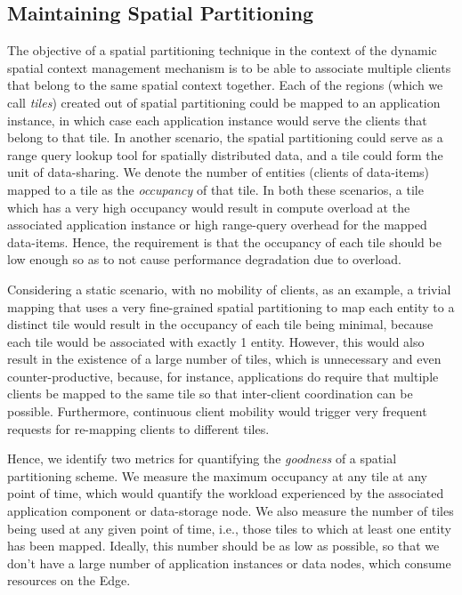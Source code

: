 \subsection{Maintaining Spatial Partitioning}
The objective of a spatial partitioning technique in the context of the dynamic spatial context management mechanism is to be able to associate multiple clients that belong to the same spatial context together. Each of the regions (which we call \textit{tiles}) created out of spatial partitioning could be mapped to an application instance, in which case each application instance would serve the clients that belong to that tile. In another scenario, the spatial partitioning could serve as a range query lookup tool for spatially distributed data, and a tile could form the unit of data-sharing. We denote the number of entities (clients of data-items) mapped to a tile as the \textit{occupancy} of that tile. In both these scenarios, a tile which has a very high occupancy would result in compute overload at the associated application instance or high range-query overhead for the mapped data-items. Hence, the requirement is that the occupancy of each tile should be low enough so as to not cause performance degradation due to overload. 
\par Considering a static scenario, with no mobility of clients, as an example, a trivial mapping that uses a very fine-grained spatial partitioning to map each entity to a distinct tile would result in the occupancy of each tile being minimal, because each tile would be associated with exactly 1 entity. However, this would also result in the existence of a large number of tiles, which is unnecessary and even counter-productive, because, for instance, applications do require that multiple clients be mapped to the same tile so that inter-client coordination can be possible. Furthermore, continuous client mobility would trigger very frequent requests for re-mapping clients to different tiles.
\par Hence, we identify two metrics for quantifying the \textit{goodness} of a spatial partitioning scheme. We measure the maximum occupancy at any tile at any point of time, which would quantify the workload experienced by the associated application component or data-storage node. We also measure the number of tiles being used at any given point of time, i.e., those tiles to which at least one entity has been mapped. Ideally, this number should be as low as possible, so that we don't have a large number of application instances or data nodes, which consume resources on the Edge.
